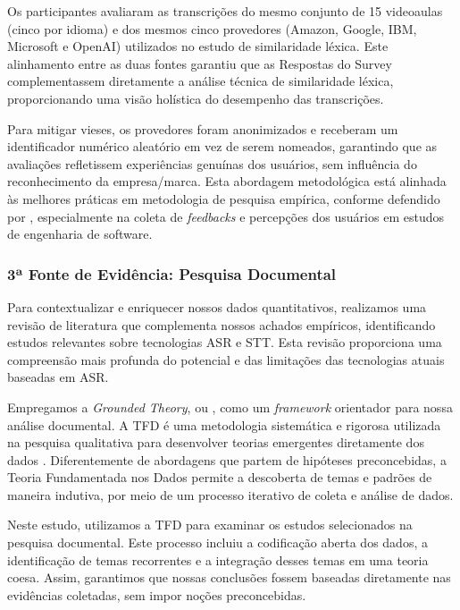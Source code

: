 Os participantes avaliaram as transcrições do mesmo conjunto de 15 videoaulas (cinco por idioma) e dos mesmos cinco provedores (Amazon, Google, IBM, Microsoft e OpenAI) utilizados no estudo de similaridade léxica. Este alinhamento entre as duas fontes garantiu que as Respostas do Survey complementassem diretamente a análise técnica de similaridade léxica, proporcionando uma visão holística do desempenho das transcrições.

Para mitigar vieses, os provedores foram anonimizados e receberam um identificador numérico aleatório em vez de serem nomeados, garantindo que as avaliações refletissem experiências genuínas dos usuários, sem influência do reconhecimento da empresa/marca. Esta abordagem metodológica está alinhada às melhores práticas em metodologia de pesquisa empírica, conforme defendido por \cite{Sommerville2015}, especialmente na coleta de \textit{feedbacks} e percepções dos usuários em estudos de engenharia de software.

\subsubsection{3ª Fonte de Evidência: Pesquisa Documental}

Para contextualizar e enriquecer nossos dados quantitativos, realizamos uma revisão de literatura que complementa nossos achados empíricos, identificando estudos relevantes sobre tecnologias ASR e STT. Esta revisão proporciona uma compreensão mais profunda do potencial e das limitações das tecnologias atuais baseadas em ASR.

Empregamos a \textit{Grounded Theory}, ou , como um \textit{framework} orientador para nossa análise documental. A TFD é uma metodologia sistemática e rigorosa utilizada na pesquisa qualitativa para desenvolver teorias emergentes diretamente dos dados \cite{Charmaz2009}. Diferentemente de abordagens que partem de hipóteses preconcebidas, a Teoria Fundamentada nos Dados permite a descoberta de temas e padrões de maneira indutiva, por meio de um processo iterativo de coleta e análise de dados.

Neste estudo, utilizamos a TFD para examinar os estudos selecionados na pesquisa documental. Este processo incluiu a codificação aberta dos dados, a identificação de temas recorrentes e a integração desses temas em uma teoria coesa. Assim, garantimos que nossas conclusões fossem baseadas diretamente nas evidências coletadas, sem impor noções preconcebidas.

